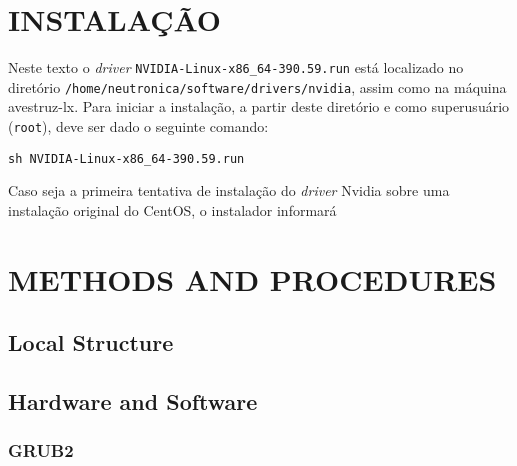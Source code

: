 \documentclass[twoside,a4paper,12pt,english]{inac17}
\begin{document}
\section{INSTALAÇÃO}

Neste texto o \textit{driver} \texttt{NVIDIA-Linux-x86\_64-390.59.run} está localizado no diretório \texttt{/home/neutronica/software/drivers/nvidia}, assim 
como na máquina avestruz-lx. Para iniciar a instalação, a partir 
deste diretório e como superusuário (\texttt{root}), deve ser dado o 
seguinte comando:

\texttt{sh NVIDIA-Linux-x86\_64-390.59.run}

Caso seja a primeira tentativa de instalação do \textit{driver} Nvidia sobre uma 
instalação original do CentOS, o instalador informará 
\section{METHODS AND PROCEDURES}

\subsection{Local Structure}


\subsection{Hardware and Software}



\subsubsection{GRUB2}
\label{ssub:grub}
\end{document}
